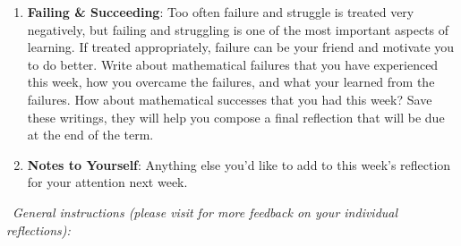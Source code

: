 \documentclass[10pt]{article}
\begin{document}
\begin{enumerate}
\item {\large {\bf Failing \& Succeeding}}:
Too often failure and struggle is treated very negatively, but failing and struggling is one of the most important aspects of learning. If treated appropriately, failure can be your friend and motivate you to do better. Write about mathematical failures that you have experienced this week, how you overcame the failures, and what your learned from the failures. How about mathematical successes that you had this week? Save these writings, they will help you compose a final reflection that will be due at the end of the term.

\item {\large {\bf Notes to Yourself}}: Anything else you'd like to add to this week's reflection for your attention next week.

\end{enumerate}

\hrulefill

\medskip
{\Large 
~{\it General instructions (please visit for more feedback on your individual reflections):}
}
\end{document}
